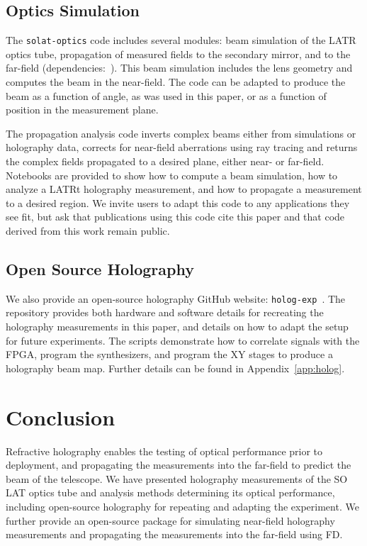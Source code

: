 \subsection{Optics Simulation}
The \verb|solat-optics| code includes several modules: beam simulation of the LATR optics tube, propagation of measured fields to the secondary mirror, and to the far-field (dependencies:~\cite{2020NumPy-Array,2020SciPy-NMeth,hunter2007matplotlib,reback2020pandas,mpiPython,tqdm}).  This beam simulation includes the lens geometry and computes the beam in the near-field.  The code can be adapted to produce the beam as a function of angle, as was used in this paper, or as a function of position in the measurement plane.  

The propagation analysis code inverts complex beams either from simulations or holography data, corrects for near-field aberrations using ray tracing and returns the complex fields propagated to a desired plane, either near- or far-field.   Notebooks are provided to show how to compute a beam simulation, how to analyze a LATRt holography measurement, and how to propagate a measurement to a desired region.  We invite users to adapt this code to any applications they see fit, but ask that publications using this code cite this paper and that code derived from this work remain public.

\subsection{Open Source Holography}
We also provide an open-source holography GitHub website:  \verb|holog-exp|~\cite{holog-exp}.  The repository provides both hardware and software details for recreating the holography measurements in this paper, and details on how to adapt the setup for future experiments.  The scripts demonstrate how to correlate signals with the FPGA, program the synthesizers, and program the XY stages to produce a holography beam map.  Further details can be found in Appendix~\ref{app:holog}.

\section{Conclusion}
\label{sec:discussion}
Refractive holography enables the testing of optical performance prior to deployment, and propagating the measurements into the far-field to predict the beam of the telescope.  We have presented holography measurements of the SO LAT optics tube and analysis methods determining its optical performance, including open-source holography for repeating and adapting the experiment.  We further provide an open-source package for simulating near-field holography measurements and propagating the measurements into the far-field using FD. 

